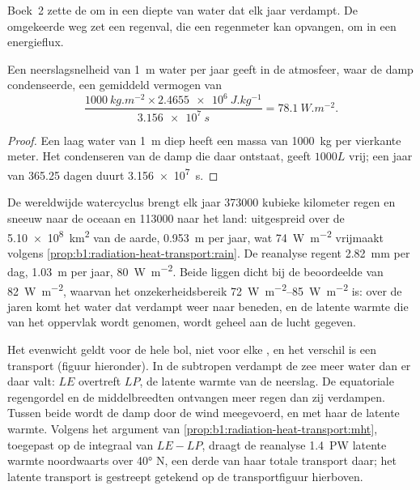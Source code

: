 Boek~2 zette de  om in een diepte van water dat elk jaar verdampt. De omgekeerde weg zet een regenval, die een regenmeter kan opvangen, om in een energieflux.

\begin{proposition}\label{prop:b1:radiation-heat-transport:rain}
Een neerslagsnelheid van \qty{1}{m} water per jaar geeft in de atmosfeer, waar de damp condenseerde, een gemiddeld vermogen van
\[
  \frac{\qty{1000}{kg.m^{-2}} \times \qty{2.4655e6}{J.kg^{-1}}}{\qty{3.156e7}{s}}
  = \qty{78.1}{W.m^{-2}} .
\]
\end{proposition}

\begin{proof}
Een laag water van \qty{1}{m} diep heeft een massa van \qty{1000}{kg} per vierkante meter. Het condenseren van de damp die daar ontstaat, geeft $1000L$ vrij; een jaar van \num{365.25} dagen duurt \qty{3.156e7}{s}.
\end{proof}

\begin{example}\label{ex:b1:radiation-heat-transport:rain}
De wereldwijde watercyclus brengt elk jaar \num{373000} kubieke kilometer regen en sneeuw naar de oceaan en \num{113000} naar het land: uitgespreid over de \qty{5.10e8}{km^2} van de aarde, \qty{0.953}{m} per jaar, wat \qty{74}{W.m^{-2}} vrijmaakt volgens \cref{prop:b1:radiation-heat-transport:rain}. De reanalyse regent \qty{2.82}{mm} per dag, \qty{1.03}{m} per jaar, \qty{80}{W.m^{-2}}. Beide liggen dicht bij de beoordeelde  van \qty{82}{W.m^{-2}}, waarvan het onzekerheidsbereik \qtyrange{72}{85}{W.m^{-2}} is: over de jaren komt het water dat verdampt weer naar beneden, en de latente warmte die van het oppervlak wordt genomen, wordt geheel aan de lucht gegeven.
\end{example}

Het evenwicht geldt voor de hele bol, niet voor elke , en het verschil is een transport (figuur hieronder). In de subtropen verdampt de zee meer water dan er daar valt: $LE$ overtreft $LP$, de latente warmte van de neerslag. De equatoriale regengordel en de middelbreedten ontvangen meer regen dan zij verdampen. Tussen beide wordt de damp door de wind meegevoerd, en met haar de latente warmte. Volgens het argument van \cref{prop:b1:radiation-heat-transport:mht}, toegepast op de integraal van $LE - LP$, draagt de reanalyse \qty{1.4}{PW} latente warmte noordwaarts over \ang{40} N, een derde van haar totale transport daar; het latente transport is gestreept getekend op de transportfiguur hierboven.

